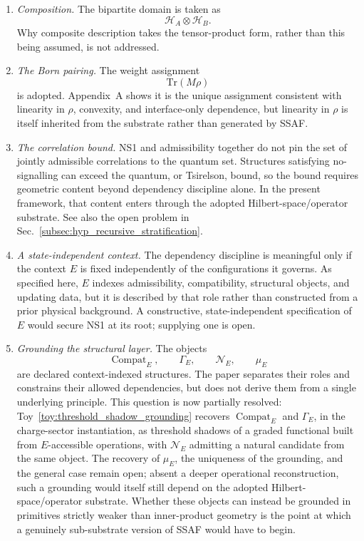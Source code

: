 \documentclass[aps,prx,onecolumn,11pt]{revtex4-2}
\theoremstyle{plain}
\theoremstyle{definition}
\theoremstyle{remark}
\newcommand{\Compat}{\operatorname{Compat}} %
\begin{document}
\begin{enumerate}[label=(\roman*), leftmargin=2.2em]

\item \emph{Composition.}
The bipartite domain is taken as
\[
\mathcal{H}_A\otimes\mathcal{H}_B.
\]
Why composite description takes the tensor-product form, rather than
this being assumed, is not addressed.

\item \emph{The Born pairing.}
The weight assignment
\[
\mathrm{Tr}(M\rho)
\]
is adopted. Appendix~A shows it is the unique assignment consistent
with linearity in \(\rho\), convexity, and interface-only dependence,
but linearity in \(\rho\) is itself inherited from the substrate rather
than generated by SSAF.

\item \emph{The correlation bound.}
NS1 and admissibility together do not pin the set of jointly admissible
correlations to the quantum set. Structures satisfying no-signalling can
exceed the quantum, or Tsirelson, bound, so the bound requires geometric
content beyond dependency discipline alone. In the present framework,
that content enters through the adopted Hilbert-space/operator
substrate. See also the open problem in
Sec.~\ref{subsec:hyp_recursive_stratification}.

\item \emph{A state-independent context.}
The dependency discipline is meaningful only if the context \(E\) is
fixed independently of the configurations it governs. As specified here,
\(E\) indexes admissibility, compatibility, structural objects, and
updating data, but it is described by that role rather than constructed
from a prior physical background. A constructive, state-independent
specification of \(E\) would secure NS1 at its root; supplying one is
open.

\item \emph{Grounding the structural layer.}
The objects
\[
\Compat_E,
\qquad
\Gamma_E,
\qquad
\mathcal N_E,
\qquad
\mu_E
\]
are declared context-indexed structures. The paper separates their
roles and constrains their allowed dependencies, but does not derive
them from a single underlying principle. This question is now partially
resolved: Toy~\ref{toy:threshold_shadow_grounding} recovers
\(\Compat_E\) and \(\Gamma_E\), in the charge-sector
instantiation, as threshold shadows of a graded functional built from
\(E\)-accessible operations, with \(\mathcal N_E\) admitting a
natural candidate from the same object. The recovery of \(\mu_E\),
the uniqueness of the grounding, and the general case remain open;
absent a deeper operational reconstruction, such a grounding
would itself still depend on the adopted Hilbert-space/operator
substrate. Whether these objects can instead be grounded in primitives
strictly weaker than inner-product geometry is the point at which a
genuinely sub-substrate version of SSAF would have to begin.


\end{enumerate}
\end{document}
